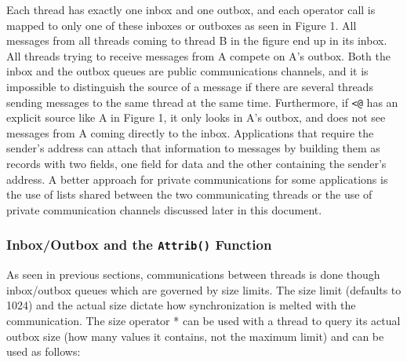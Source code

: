
Each thread has exactly one inbox and one outbox, and each operator call
is mapped to only one of these inboxes or outboxes as seen in Figure 1.
All messages from all threads coming to thread B in the figure end up
in its inbox. All threads trying to receive messages from A compete on
A{\textquoteright}s outbox. Both the inbox and the outbox queues are
public communications channels, and it is impossible to distinguish the
source of a message if there are several threads sending messages to
the same thread at the same time. Furthermore, if
\texttt{{\textless}@} has an explicit source like A in
Figure 1, it only looks in A{\textquoteright}s outbox, and does not see
messages from A coming directly to the inbox. Applications that require
the sender{\textquoteright}s address can attach that information to
messages by building them as records with two fields, one field for
data and the other containing the sender{\textquoteright}s address. A
better approach for private communications for some applications is the
use of lists shared between the two communicating threads or the use of
private communication channels discussed later in this document. 

\subsubsection[Inbox/Outbox and the Attrib() Function ]{Inbox/Outbox and
the \texttt{Attrib()} Function }

As seen in previous sections, communications between threads is done
though inbox/outbox queues which are governed by size limits. The size
limit (defaults to 1024) and the actual size dictate how synchronization
is melted with the communication. The size operator * can be used with
a thread to query its actual outbox size (how many values it contains,
not the maximum limit) and can be used as follows:

